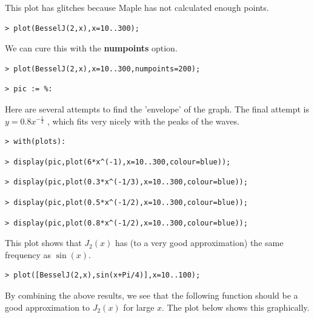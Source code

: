 \documentclass{article}
\begin{document}
\begin{Maple Normal}
This plot has glitches because Maple has not calculated enough points.
\end{Maple Normal}
\begin{lstlisting}
> plot(BesselJ(2,x),x=10..300);
\end{lstlisting}
\begin{Maple Normal}
We can cure this with the \textcolor[RGB]{255,0,0}{\textbf{numpoints}} option.
\end{Maple Normal}
\begin{lstlisting}
> plot(BesselJ(2,x),x=10..300,numpoints=200);
\end{lstlisting}
\begin{lstlisting}
> pic := %:
\end{lstlisting}
\begin{Maple Normal}
Here are several attempts to find the 'envelope' of the graph.  The final attempt is 
$y = 0.8 x^{-\frac{1}{2}}$ , which fits very nicely with the peaks of the waves.
\end{Maple Normal}
\begin{lstlisting}
> with(plots):
\end{lstlisting}
\begin{lstlisting}
> display(pic,plot(6*x^(-1),x=10..300,colour=blue));
\end{lstlisting}
\begin{lstlisting}
> display(pic,plot(0.3*x^(-1/3),x=10..300,colour=blue));
\end{lstlisting}
\begin{lstlisting}
> display(pic,plot(0.5*x^(-1/2),x=10..300,colour=blue));
\end{lstlisting}
\begin{lstlisting}
> display(pic,plot(0.8*x^(-1/2),x=10..300,colour=blue));
\end{lstlisting}
\begin{Maple Normal}
This plot shows that 
$J_{2}(x)$ has (to a very good approximation) the same frequency as 
$\sin (x)$.
\end{Maple Normal}
\begin{lstlisting}
> plot([BesselJ(2,x),sin(x+Pi/4)],x=10..100);
\end{lstlisting}
\begin{Maple Normal}
By combining the above results, we see that the following function should be a good approximation to 
$J_{2}(x)$ for large 
$x$.  The plot below shows this graphically.
\end{Maple Normal}
\end{document}
